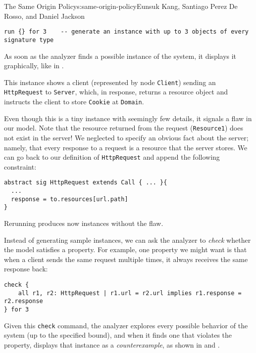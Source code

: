 \begin{aosachapter}{The Same Origin Policy}{s:same-origin-policy}{Eunsuk Kang, Santiago Perez De Rosso, and Daniel Jackson}
\begin{verbatim}
run {} for 3    -- generate an instance with up to 3 objects of every signature type
\end{verbatim}

As soon as the analyzer finds a possible instance of the system, it
displays it graphically, like in
.


This instance shows a client (represented by node \texttt{Client})
sending an \texttt{HttpRequest} to \texttt{Server}, which, in response,
returns a resource object and instructs the client to store
\texttt{Cookie} at \texttt{Domain}.

Even though this is a tiny instance with seemingly few details, it
signals a flaw in our model. Note that the resource returned from the
request (\texttt{Resource1}) does not exist in the server! We neglected
to specify an obvious fact about the server; namely, that every response
to a request is a resource that the server stores. We can go back to our
definition of \texttt{HttpRequest} and append the following constraint:

\begin{verbatim}
abstract sig HttpRequest extends Call { ... }{
  ...
  response = to.resources[url.path]
}
\end{verbatim}

Rerunning produces now instances without the flaw.

Instead of generating sample instances, we can ask the analyzer to
\emph{check} whether the model satisfies a property. For example, one
property we might want is that when a client sends the same request
multiple times, it always receives the same response back:

\begin{verbatim}
check { 
    all r1, r2: HttpRequest | r1.url = r2.url implies r1.response = r2.response 
} for 3 
\end{verbatim}

Given this \texttt{check} command, the analyzer explores every possible
behavior of the system (up to the specified bound), and when it finds
one that violates the property, displays that instance as a
\emph{counterexample}, as shown in
 and
.


\end{aosachapter}

